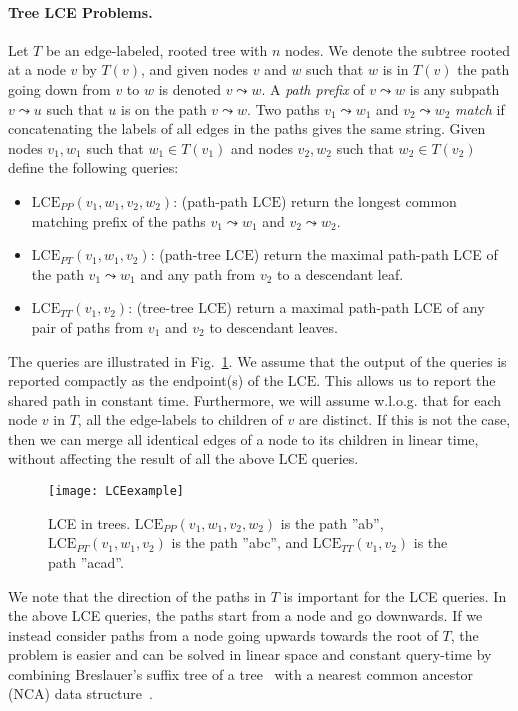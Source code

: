 \documentclass [10pt]{article}
\newcommand{\LCE}{\ensuremath{\mathrm{LCE}}}
\newcommand{\LCEPP}{\ensuremath{\mathrm{LCE}_{\mathit{PP}}}}
\newcommand{\LCEPT}{\ensuremath{\mathrm{LCE}_{\mathit{PT}}}}
\newcommand{\LCETT}{\ensuremath{\mathrm{LCE}_{\mathit{TT}}}}
\begin{document}
\paragraph{\bf Tree LCE Problems.}
Let $T$ be an edge-labeled, rooted tree with $n$ nodes. 
We denote the subtree rooted at a node $v$ by $T(v)$, and  given nodes $v$ and $w$ such that $w$ is in $T(v)$ the path going down from $v$ to $w$ is denoted $v \leadsto w$. A \emph{path prefix} of $v \leadsto w$ is any subpath $v \leadsto u$ such that $u$ is on the path $v \leadsto w$. Two paths $v_1 \leadsto w_1$ and $v_2 \leadsto w_2$ \emph{match} if  concatenating the labels of all edges in the paths gives the same string. Given nodes  $v_1, w_1$ such that $w_1 \in T(v_1)$ and nodes $v_2, w_2$ such that  $w_2 \in T(v_2)$ define the following queries:
\begin{itemize}
\item $\LCEPP(v_1, w_1, v_2, w_2)$: (path-path $\LCE$) return the longest common matching prefix of the paths $v_1 \leadsto w_1$ and $v_2 \leadsto w_2$.
\item $\LCEPT(v_1, w_1, v_2)$: (path-tree $\LCE$) return the maximal path-path LCE of the path $v_1 \leadsto w_1$ and any path from $v_2$ to a descendant leaf.
\item $\LCETT(v_1, v_2)$: (tree-tree $\LCE$) return a maximal path-path LCE of any pair of paths from $v_1$ and $v_2$ to  descendant leaves.
\end{itemize}
The queries are illustrated in Fig.~\ref{fig:LCEexample}. We assume that the output of the queries is reported compactly as the endpoint(s) of the $\LCE$. This allows us to report the shared path in constant time. Furthermore, we will assume w.l.o.g. that for each node $v$ in $T$, all the edge-labels to children of  $v$ are distinct. If this is not the case, then we can merge all identical edges of a node to its children in linear time, without affecting the result of all the above $\LCE$ queries. 


\begin{figure}[t] \centering
   \texttt{[image: LCEexample]} 
   \caption{LCE in trees. $\LCEPP(v_1, w_1, v_2, w_2)$ is the path ''ab'', $\LCEPT(v_1, w_1, v_2)$ is the path ''abc'', and $\LCETT(v_1, v_2)$ is the path ''acad''.}
   \label{fig:LCEexample}
\end{figure}
We note that the direction of the paths in $T$ is important for the LCE queries. In the above LCE queries, the paths start from a node and go downwards. If we instead consider paths from a node going upwards towards the root of $T$, the problem is easier and can be solved in linear space and constant query-time by combining Breslauer's suffix tree of a tree~\cite{Breslauer1998} with a nearest common ancestor (NCA) data structure~\cite{HT1984}.
\end{document}
